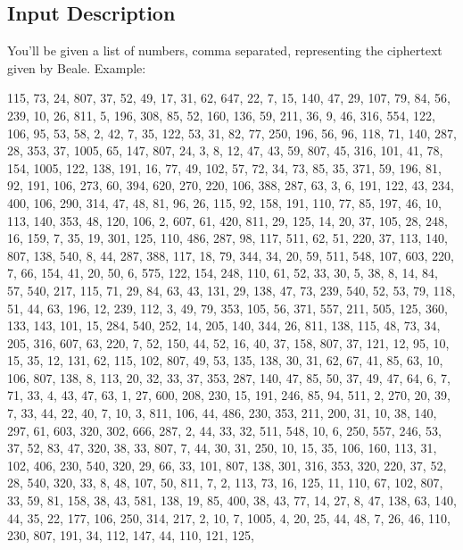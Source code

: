 \subsection*{Input Description}\label{input-description-12}

You'll be given a list of numbers, comma separated, representing the
ciphertext given by Beale. Example:

115, 73, 24, 807, 37, 52, 49, 17, 31, 62, 647, 22, 7, 15, 140, 47, 29,
107, 79, 84, 56, 239, 10, 26, 811, 5, 196, 308, 85, 52, 160, 136, 59,
211, 36, 9, 46, 316, 554, 122, 106, 95, 53, 58, 2, 42, 7, 35, 122, 53,
31, 82, 77, 250, 196, 56, 96, 118, 71, 140, 287, 28, 353, 37, 1005, 65,
147, 807, 24, 3, 8, 12, 47, 43, 59, 807, 45, 316, 101, 41, 78, 154,
1005, 122, 138, 191, 16, 77, 49, 102, 57, 72, 34, 73, 85, 35, 371, 59,
196, 81, 92, 191, 106, 273, 60, 394, 620, 270, 220, 106, 388, 287, 63,
3, 6, 191, 122, 43, 234, 400, 106, 290, 314, 47, 48, 81, 96, 26, 115,
92, 158, 191, 110, 77, 85, 197, 46, 10, 113, 140, 353, 48, 120, 106, 2,
607, 61, 420, 811, 29, 125, 14, 20, 37, 105, 28, 248, 16, 159, 7, 35,
19, 301, 125, 110, 486, 287, 98, 117, 511, 62, 51, 220, 37, 113, 140,
807, 138, 540, 8, 44, 287, 388, 117, 18, 79, 344, 34, 20, 59, 511, 548,
107, 603, 220, 7, 66, 154, 41, 20, 50, 6, 575, 122, 154, 248, 110, 61,
52, 33, 30, 5, 38, 8, 14, 84, 57, 540, 217, 115, 71, 29, 84, 63, 43,
131, 29, 138, 47, 73, 239, 540, 52, 53, 79, 118, 51, 44, 63, 196, 12,
239, 112, 3, 49, 79, 353, 105, 56, 371, 557, 211, 505, 125, 360, 133,
143, 101, 15, 284, 540, 252, 14, 205, 140, 344, 26, 811, 138, 115, 48,
73, 34, 205, 316, 607, 63, 220, 7, 52, 150, 44, 52, 16, 40, 37, 158,
807, 37, 121, 12, 95, 10, 15, 35, 12, 131, 62, 115, 102, 807, 49, 53,
135, 138, 30, 31, 62, 67, 41, 85, 63, 10, 106, 807, 138, 8, 113, 20, 32,
33, 37, 353, 287, 140, 47, 85, 50, 37, 49, 47, 64, 6, 7, 71, 33, 4, 43,
47, 63, 1, 27, 600, 208, 230, 15, 191, 246, 85, 94, 511, 2, 270, 20, 39,
7, 33, 44, 22, 40, 7, 10, 3, 811, 106, 44, 486, 230, 353, 211, 200, 31,
10, 38, 140, 297, 61, 603, 320, 302, 666, 287, 2, 44, 33, 32, 511, 548,
10, 6, 250, 557, 246, 53, 37, 52, 83, 47, 320, 38, 33, 807, 7, 44, 30,
31, 250, 10, 15, 35, 106, 160, 113, 31, 102, 406, 230, 540, 320, 29, 66,
33, 101, 807, 138, 301, 316, 353, 320, 220, 37, 52, 28, 540, 320, 33, 8,
48, 107, 50, 811, 7, 2, 113, 73, 16, 125, 11, 110, 67, 102, 807, 33, 59,
81, 158, 38, 43, 581, 138, 19, 85, 400, 38, 43, 77, 14, 27, 8, 47, 138,
63, 140, 44, 35, 22, 177, 106, 250, 314, 217, 2, 10, 7, 1005, 4, 20, 25,
44, 48, 7, 26, 46, 110, 230, 807, 191, 34, 112, 147, 44, 110, 121, 125,
